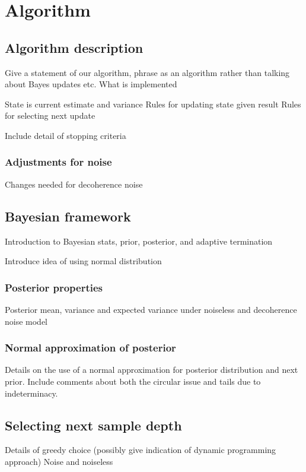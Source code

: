 
\section{Algorithm}

\subsection{Algorithm description}
Give a statement of our algorithm, phrase as an algorithm rather than talking about Bayes updates etc. What is implemented

State is current estimate and variance
Rules for updating state given result
Rules for selecting next update

Include detail of stopping criteria

\subsubsection{Adjustments for noise}
Changes needed for decoherence noise

\subsection{Bayesian framework}
Introduction to Bayesian stats, prior, posterior, and adaptive termination

Introduce idea of using normal distribution 


\subsubsection{Posterior properties}
Posterior mean, variance and expected variance under noiseless and decoherence noise model

\subsubsection{Normal approximation of posterior}
Details on the use of a normal approximation for posterior distribution and next prior.
Include comments about both the circular issue and tails due to indeterminacy. 

\subsection{Selecting next sample depth}
Details of greedy choice (possibly give indication of dynamic programming approach)
Noise and noiseless

\newpage
